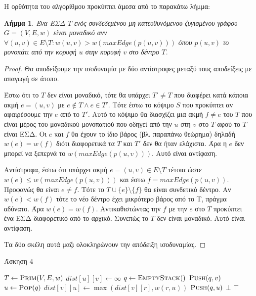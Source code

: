 \documentclass[11pt,a4paper,oneside]{report}
\newtheorem*{lemma}{Λήμμα}
\begin{document}
Η ορθότητα του αλγορίθμου προκύπτει άμεσα από το παρακάτω λήμμα:

\begin{lemma}
Ένα ΕΣΔ $T$ ενός συνδεδεμένου μη κατευθυνόμενου ζυγισμένου γράφου $G = (V, E, w)$ είναι μοναδικό ανν $\forall (u, v) \in E \setminus T: w( u, v ) > w(maxEdge(p(u, v)))$ όπου $p(u, v)$ το μονοπάτι από την κορυφή $u$ στην κορυφή $v$ στο δέντρο $T$.
\end{lemma}

\begin{proof}
Θα αποδείξουμε την ισοδυναμία με δύο αντίστροφες μεταξύ τους αποδείξεις με απαγωγή σε άτοπο.

Έστω ότι το $T$ δεν είναι μοναδικό, τότε θα υπάρχει $T' \neq T$ που διαφέρει κατά κάποια ακμή $e = (u, v)$ με $e \not\in T \land e \in T'$. Τότε έστω το κόψιμο $S$ που προκύπτει αν αφαιρέσουμε την $e$ από το $T'$. Αυτό το κόψιμο θα διασχίζει μια ακμή $f \neq e$ του $T$ που είναι μέρος του μοναδικού μονοπατιού που οδηγεί από την $u$ στη $v$ στο $T$ αφού το $T$ είναι ΕΣΔ. Οι $e$ και $f$ θα έχουν το ίδιο βάρος (βλ. παραπάνω θεώρημα) δηλαδή $w( e ) = w( f )$ διότι διαφορετικά τα $T$ και $T'$ δεν θα ήταν ελάχιστα. Άρα η $e$ δεν μπορεί να ξεπερνά το $w(maxEdge(p(u, v)))$. Αυτό είναι αντίφαση.

Αντίστροφα, έστω ότι υπάρχει ακμή $e = (u, v) \in E \setminus T$ τέτοια ώστε $w( e ) \leq w(maxEdge(p(u, v)))$ και έστω $f = maxEdge(p(u, v))$. Προφανώς θα είναι $e \neq f$. Τότε το $T \cup \{e\} \setminus \{f\}$ θα είναι συνδετικό δέντρο. Αν $w( e ) < w( f )$ τότε το νέο δέντρο έχει μικρότερο βάρος από το T, πράγμα αδύνατο. Άρα $w( e ) = w( f )$. Αντικαθιστώντας την $f$ με την $e$ στο $T$ προκύπτει ένα ΕΣΔ διαφορετικό από το αρχικό. Συνεπώς το $T$ δεν είναι μοναδικό. Αυτό είναι αντίφαση.

Τα δύο σκέλη αυτά μαζι ολοκληρώνουν την απόδειξη ισοδυναμίας.
\end{proof}

\begin{algorithm}[H]
\caption{\textgreek{Άσκηση 4}}
\begin{algorithmic}[1]

	\State $T \gets \Call{Prim}{V, E, w}$
		\State $dist[ u ][ v ] \gets \infty$
	\EndFor
		\State $q \gets \Call{EmptyStack}$
		\State $\Call{Push}{q,v}$
			\State $u \gets \Call{Pop}{q}$
					\State $dist[ v ][ u ] \gets \max( dist[ v ][ r ], w( r, u ) )$
					\State $\Call{Push}{q,u}$
				\EndIf
			\EndFor
		\EndWhile
	\EndFor
			\State \Return $\bot$
		\EndIf
	\EndFor
	\State \Return $\top$
\EndProcedure
\end{algorithmic}
\end{algorithm}
\end{document}
